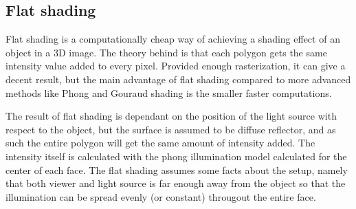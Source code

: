 \subsection{Flat shading}

Flat shading is a computationally cheap way of achieving a shading effect of an
object in a 3D image. The theory behind is that each polygon gets the same
intensity value added to every pixel. Provided enough rasterization, it can
give a decent result, but the main advantage of flat shading compared to more
advanced methods like Phong and Gouraud shading is the smaller faster computations. 

The result of flat shading is dependant on the position of the light
source with respect to the object, but the surface is assumed to be
diffuse reflector, and as such the entire polygon will get the same amount of
intensity added. The intensity itself is calculated with the phong
illumination model calculated for the center of each face. The flat
shading assumes some facts about the setup, namely that both viewer and light
source is far enough away from the object so that the illumination can be
spread evenly (or constant) througout the entire face.
